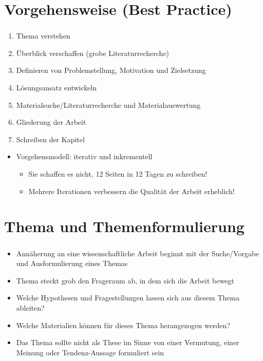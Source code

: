 \documentclass[aspectratio=169]{beamer}
\begin{document}
\section{Vorgehensweise (Best Practice)}
\begin{frame}
  \frametitle{\insertsection}%
  \framesubtitle{\insertsubsection}%
  \begin{enumerate}
   \item Thema verstehen
   \item Überblick verschaffen (grobe Literaturrecherche)
   \item Definieren von Problemstellung, Motivation und Zielsetzung
   \item Lösungsansatz entwickeln
   \item Materialsuche/Literaturrecherche und Materialauswertung
   \item Gliederung der Arbeit
   \item Schreiben der Kapitel
  \end{enumerate}
  
  \begin{itemize}
   \item Vorgehensmodell: iterativ und inkrementell
   \begin{itemize}
    \item Sie schaffen es nicht, 12 Seiten in 12 Tagen zu schreiben!
    \item Mehrere Iterationen verbessern die Qualität der Arbeit erheblich!
   \end{itemize}
  \end{itemize}
\end{frame}

\section{Thema und Themenformulierung}
\begin{frame}
  \frametitle{\insertsection}%
  \framesubtitle{\insertsubsection}%
  \begin{itemize}
   \item Annäherung an eine wissenschaftliche Arbeit beginnt mit der Suche/Vorgabe und Ausformulierung eines Themas
   \item Thema steckt grob den Frageraum ab, in dem sich die Arbeit bewegt
   \item Welche Hypothesen und Fragestellungen lassen sich aus diesem Thema ableiten?
   \item Welche Materialien können für dieses Thema herangezogen werden?
   \item Das Thema sollte nicht als These im Sinne von einer Vermutung, einer Meinung oder Tendenz-Aussage formuliert sein
  \end{itemize}
\end{frame}
\end{document}

